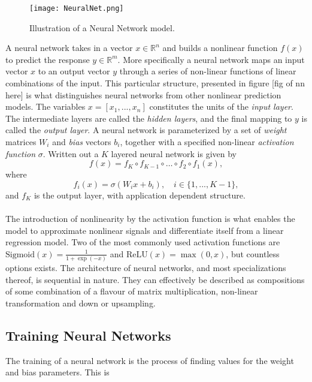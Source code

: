 \documentclass[../../thesis.tex]{subfiles}
\begin{document}
\begin{figure}
    \texttt{[image: NeuralNet.png]}
    \centering 
    \caption{Illustration of a Neural Network model.}
    \label{fig:NeuralNet}
\end{figure}

A neural network takes in a vector $x \in \mathbb{R}^n$ and builds a nonlinear function $f(x)$ to predict the response $y\in \mathbb{R}^m$. More specifically a neural network maps an input vector $x$ to an output vector $y$ through a series of non-linear functions of linear combinations of the input. This particular structure, presented in figure [fig of nn here] is what distinguishes neural networks from other nonlinear prediction models. The variables $x = [x_1,...,x_n]$ constitutes the units of the \textit{input layer}. The intermediate layers are called the \textit{hidden layers}, and the final mapping to $y$ is called the \textit{output layer}. A neural network is parameterized by a set of \textit{weight} matrices $W_i$ and \textit{bias} vectors $b_i$, together with a specified non-linear \textit{activation function} $\sigma$. Written out a $K$ layered neural network is given by 
\[ 
f(x) = f_K \circ f_{K-1} \circ \ldots \circ f_2 \circ f_1(x),
\]
where 
$$f_i(x) = \sigma(W_ix+b_i), \quad i \in \{1,...,K-1\},$$ 
and $f_K$ is the output layer, with application dependent structure.\\\\ 

The introduction of nonlinearity by the activation function is what enables the model to approximate nonlinear signals and differentiate itself from a linear regression model. Two of the most commonly used activation functions are $\text{Sigmoid}(x) = \tfrac{1}{1+\exp(-x)}$ and $\text{ReLU}(x) = \max(0,x)$, but countless options exists.\newline
The architecture of neural networks, and most specializations thereof, is sequential in nature. They can effectively be described as compositions of some combination of a flavour of matrix multiplication, non-linear transformation and down or upsampling. 

\subsection{Training Neural Networks}

The training of a neural network is the process of finding values for the weight and bias parameters. This is 

\end{document}
